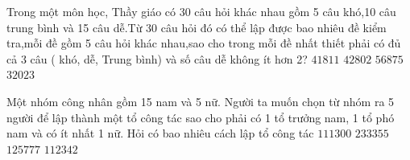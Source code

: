 \begin{ex}
	Trong một môn học, Thầy giáo có 30 câu hỏi khác nhau gồm 5 câu khó,10 câu trung bình và 15 câu dễ.Từ 30 câu hỏi đó có thể lập được bao nhiêu đề kiểm tra,mỗi đề gồm 5 câu hỏi khác nhau,sao cho trong mỗi đề nhất thiết phải có đủ cả 3 câu ( khó, dễ, Trung bình) và số câu dễ không ít hơn 2?
	\choice
	{$41811$}
	{$42802$}
	{\True $56875$}
	{$32023$}
\end{ex}

\begin{ex}
	Một nhóm công nhân gồm 15 nam và 5 nữ. Người ta muốn chọn từ nhóm ra 5 người để lập thành một tổ công tác sao cho phải có 1 tổ trưởng nam, 1 tổ phó nam và có ít nhất 1 nữ. Hỏi có bao nhiêu cách lập tổ công tác
	\choice
	{\True $111300$}
	{$233355$}
	{$125777$}
	{$112342$}
\end{ex}

